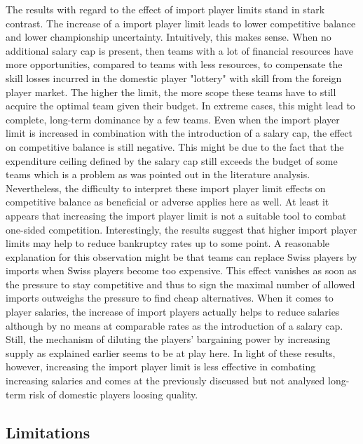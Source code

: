 \documentclass[12pt, a4paper]{article}
\begin{document}
\noindent
The results with regard to the effect of import player limits stand in stark contrast. The increase of a import player limit leads to lower competitive balance and lower championship uncertainty. Intuitively, this makes sense. When no additional salary cap is present, then teams with a lot of financial resources have more opportunities, compared to teams with less resources, to compensate the skill losses incurred in the domestic player "lottery" with skill from the foreign player market. The higher the limit, the more scope these teams have to still acquire the optimal team given their budget. In extreme cases, this might lead to complete, long-term dominance by a few teams. Even when the import player limit is increased in combination with the introduction of a salary cap, the effect on competitive balance is still negative. This might be due to the fact that the expenditure ceiling defined by the salary cap still exceeds the budget of some teams which is a problem as was pointed out in the literature analysis. Nevertheless, the difficulty to interpret these import player limit effects on competitive balance as beneficial or adverse applies here as well. At least it appears that increasing the import player limit is not a suitable tool to combat one-sided competition. Interestingly, the results suggest that higher import player limits may help to reduce bankruptcy rates up to some point. A reasonable explanation for this observation might be that teams can replace Swiss players by imports when Swiss players become too expensive. This effect vanishes as soon as the pressure to stay competitive and thus to sign the maximal number of allowed imports outweighs the pressure to find cheap alternatives. When it comes to player salaries, the increase of import players actually helps to reduce salaries although by no means at comparable rates as the introduction of a salary cap. Still, the mechanism of diluting the players' bargaining power by increasing supply as explained earlier seems to be at play here. In light of these results, however, increasing the import player limit is less effective in combating increasing salaries and comes at the previously discussed but not analysed long-term risk of domestic players loosing quality. 



\subsection{Limitations}
\end{document}

